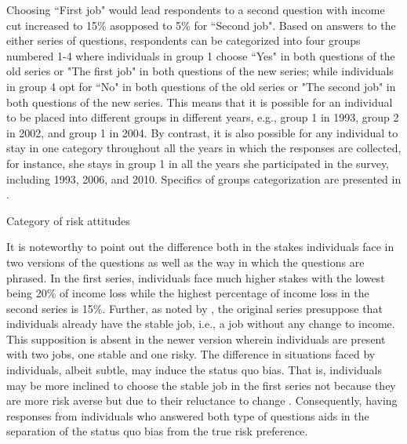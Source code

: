 \documentclass[]{article}
\begin{document}
Choosing ``First job" would lead respondents to a second question with income cut increased to 15\% asopposed to 5\% for ``Second job". Based on answers to the either series of questions, respondents can be categorized into four groups numbered 1-4 where individuals in group 1 choose ``Yes" in both questions of the old series or "The first job" in both questions of the new series; while individuals in group 4 opt for ``No" in both questions of the old series or "The second job" in both questions of the new series. This means that it is possible for an individual to be placed into different groups in different years, e.g., group 1 in 1993, group 2 in 2002, and group 1 in 2004. By contrast, it is also possible for any individual to stay in one category throughout all the years in which the responses are collected, for instance, she stays in group 1 in all the years she participated in the survey, including 1993, 2006, and 2010. Specifics of groups categorization are presented in . 

\begin{table}[!b]
	\centering
	\setlength{\extrarowheight}{0.2em}
	\caption{Category of risk attitudes}	
	
	\label{table:1-risk-category}
\end{table}

It is noteworthy to point out the difference both in the stakes individuals face in two versions of the questions as well as the way in which the questions are phrased. In the first series, individuals face much higher stakes with the lowest being 20\% of income loss while the highest percentage of income loss in the second series is 15\%. Further, as noted by \citet{kimball2008imputing,kimball2009risk}, the original series presuppose that individuals already have the stable job, i.e., a job without any change to income. This supposition is absent in the newer version wherein individuals are present with two jobs, one stable and one risky. The difference in situations faced by individuals, albeit subtle, may induce the status quo bias. That is, individuals may be more inclined to choose the stable job in the first series not because they are more risk averse but due to their reluctance to change \citep{samuelson1988status,tversky1991loss}. Consequently, having responses from individuals who answered both type of questions aids in the separation of the status quo bias from the true risk preference.
\end{document}
